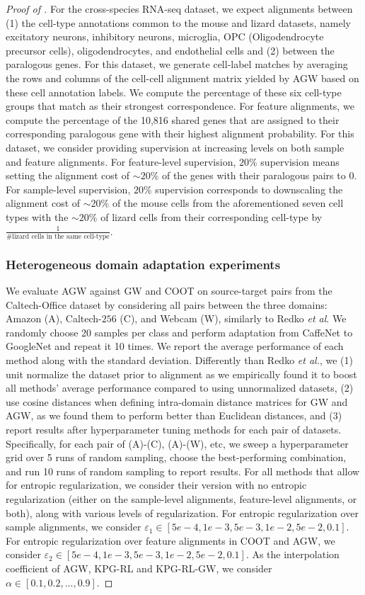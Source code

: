 \begin{proof}[Proof of ]
For the cross-species RNA-seq dataset, we expect alignments between (1) the cell-type annotations
common to the mouse and lizard datasets, namely excitatory neurons, inhibitory neurons,
microglia, OPC (Oligodendrocyte precursor cells), oligodendrocytes, and endothelial cells
and (2) between the paralogous genes. For this dataset, we generate cell-label matches
by averaging the rows and columns of the cell-cell alignment matrix yielded by AGW based on
these cell annotation labels. We compute the percentage of these six cell-type groups that
match as their strongest correspondence. For feature alignments, we compute the percentage
of the 10,816 shared genes that are assigned to their corresponding paralogous gene with
their highest alignment probability. For this dataset, we consider providing supervision at
increasing levels on both sample and feature alignments. For feature-level supervision,
$20\%$ supervision means setting the alignment cost of $\sim 20\%$ of the genes with
their paralogous pairs to $0$. For sample-level supervision, $20\%$ supervision corresponds
to downscaling the alignment cost of $\sim 20\%$ of the mouse cells from the aforementioned
seven cell types with the $\sim 20\%$ of lizard cells from their corresponding cell-type by
$\frac{1}{\textrm{\# lizard cells in the same cell-type}}$.

\subsubsection{Heterogeneous domain adaptation experiments}
We evaluate AGW against GW and COOT on source-target pairs from the Caltech-Office dataset
\citep{Saenko10}by considering all pairs between the three domains: Amazon (A), Caltech-$256$ (C),
and Webcam (W), similarly to Redko \textit{et al}. We randomly choose 20 samples per class
and perform adaptation from CaffeNet to GoogleNet and repeat it 10 times.
We report the average performance of each method along with the standard deviation.
Differently than Redko \textit{et al.}, we (1) unit normalize the dataset prior to alignment
as we empirically found it to boost all methods' average performance compared to using
unnormalized datasets, (2) use cosine distances when defining intra-domain distance matrices
for GW and AGW, as we found them to perform better than Euclidean distances,
and (3) report results after hyperparameter tuning methods for each pair of datasets.
Specifically, for each pair of (A)-(C), (A)-(W), etc, we sweep a hyperparameter grid over
5 runs of random sampling, choose the best-performing combination, and run
10 runs of random sampling to report results. For all methods that allow for entropic regularization,
we consider their version with no entropic regularization (either on the sample-level alignments,
feature-level alignments, or both), along with various levels of regularization.
For entropic regularization over sample alignments, we consider
$\varepsilon_1 \in [ 5e-4, 1e-3, 5e-3, 1e-2, 5e-2, 0.1] $.  For entropic regularization over
feature alignments in COOT and AGW, we consider $\varepsilon_2 \in [ 5e-4, 1e-3, 5e-3, 1e-2, 5e-2, 0.1]$.
As the interpolation coefficient of AGW, KPG-RL and KPG-RL-GW, we consider
$\alpha \in [ 0.1, 0.2, ..., 0.9]$.


\end{proof}
